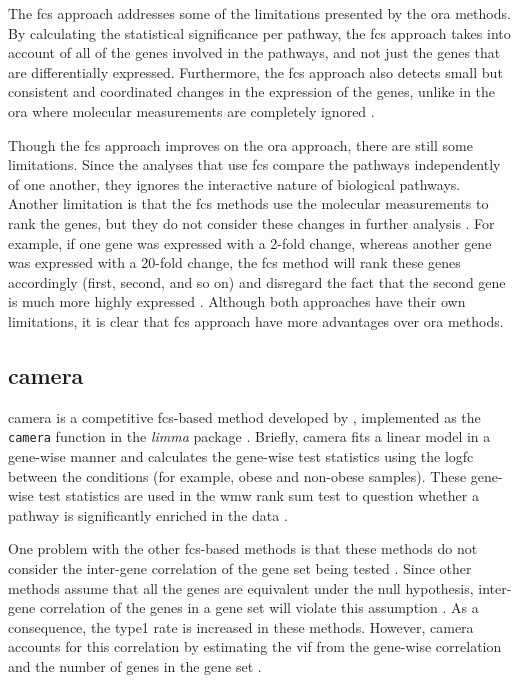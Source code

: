 The \Gls{fcs} approach addresses some of the limitations presented by the \gls{ora} methods.
By calculating the statistical significance per pathway, the \gls{fcs} approach takes into account of all of the genes involved in the pathways, and not just the genes that are differentially expressed.
Furthermore, the \gls{fcs} approach also detects small but consistent and coordinated changes in the expression of the genes, unlike in the \gls{ora} where molecular measurements are completely ignored \citep{Khatri2012}.

Though the \gls{fcs} approach improves on the \gls{ora} approach, there are still some limitations.
Since the analyses that use \gls{fcs} compare the pathways independently of one another, they ignores the interactive nature of biological pathways.
Another limitation is that the \gls{fcs} methods use the molecular measurements to rank the genes, but they do not consider these changes in further analysis \citep{Khatri2012}.
For example, if one gene was expressed with a 2-fold change, whereas another gene was expressed with a 20-fold change, the \gls{fcs} method will rank these genes accordingly (first, second, and so on) and disregard the fact that the second gene is much more highly expressed \citep{Khatri2012}.
Although both approaches have their own limitations, it is clear that \gls{fcs} approach have more advantages over \gls{ora} methods.

\subsection{\Gls{camera}}
\label{sub:camera}

\Acrfull{camera} is a competitive \gls{fcs}-based method developed by \citet{Wu2012}, implemented as the \texttt{camera} function in the \textit{limma} package \citep{Ritchie2015}.
Briefly, \gls{camera} fits a linear model in a gene-wise manner and calculates the gene-wise test statistics using the log\gls{fc} between the conditions (for example, obese and non-obese samples).
These gene-wise test statistics are used in the \gls{wmw} rank sum test to question whether a pathway is significantly enriched in the data \citep{Wu2012}.

One problem with the other \gls{fcs}-based methods is that these methods do not consider the inter-gene correlation of the gene set being tested \citep{Wu2012}.
Since other methods assume that all the genes are equivalent under the null hypothesis, inter-gene correlation of the genes in a gene set will violate this assumption \citep{Wu2012}.
As a consequence, the \gls{type1} rate is increased in these methods.
However, \Gls{camera} accounts for this correlation by estimating the \gls{vif} from the gene-wise correlation and the number of genes in the gene set \citep{Wu2012}.


